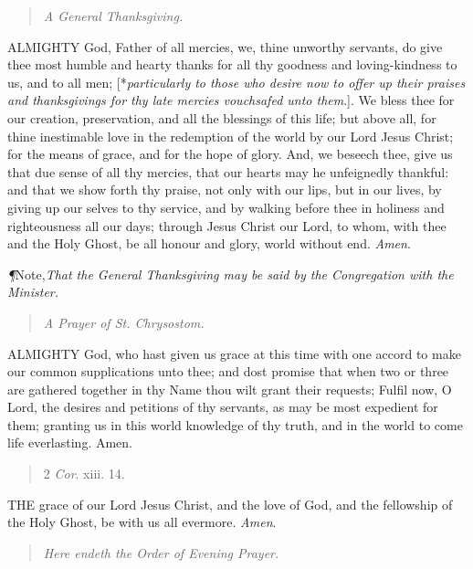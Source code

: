 \begin{quote}

\emph{A
General Thanksgiving.}

\end{quote}

ALMIGHTY
God, Father of all mercies, we, thine unworthy servants, do give thee
most humble and hearty thanks for all thy goodness and loving-kindness
to us, and to all men; [*\emph{particularly to
those who desire now to offer up their praises and thanksgivings for thy
late mercies vouchsafed unto them}.]. We bless thee for our creation,
preservation, and all the blessings of this life; but above all, for thine
inestimable love in the redemption of the world by our Lord Jesus Christ;
for the means of grace, and for the hope of glory. And, we beseech thee,
give us that due sense of all thy mercies, that our hearts may he unfeignedly
thankful: and that we show forth thy praise, not only with our lips, but
in our lives, by giving up our selves to thy service, and by walking before
thee in holiness and righteousness all our days; through Jesus Christ
our Lord, to whom, with thee and the Holy Ghost, be all honour and glory,
world without end. \emph{Amen}.

\emph{¶}Note,\emph{That the General Thanksgiving may be said by the Congregation
with the Minister.}

\begin{quote}

\emph{A
Prayer of St. Chrysostom.}

\end{quote}

ALMIGHTY
God, who hast given us grace at this time with one accord to make our
common supplications unto thee; and dost promise that when two or three
are gathered together in thy Name thou wilt grant their requests; Fulfil
now, O Lord, the desires and petitions of thy servants, as may be most
expedient for them; granting us in this world knowledge of thy truth,
and in the world to come life everlasting. Amen.

\begin{quote}

2 \emph{Cor}.
xiii. 14.

\end{quote}

THE
grace of our Lord Jesus Christ, and the love of God, and the fellowship
of the Holy Ghost, be with us all evermore. \emph{Amen}.

\begin{quote}

\emph{Here
endeth the Order of Evening Prayer.}

\end{quote}


